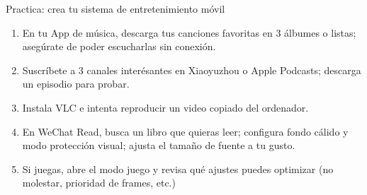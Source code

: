 \begin{tcbpractice}{Practica: crea tu sistema de entretenimiento móvil}
\begin{enumerate}
  \item En tu App de música, descarga tus canciones favoritas en 3 álbumes o listas; asegúrate de poder escucharlas sin conexión.
  \item Suscríbete a 3 canales interésantes en Xiaoyuzhou o Apple Podcasts; descarga un episodio para probar.
  \item Instala VLC e intenta reproducir un video copiado del ordenador.
  \item En WeChat Read, busca un libro que quieras leer; configura fondo cálido y modo protección visual; ajusta el tamaño de fuente a tu gusto.
  \item Si juegas, abre el modo juego y revisa qué ajustes puedes optimizar (no molestar, prioridad de frames, etc.)
\end{enumerate}

\end{tcbpractice}
